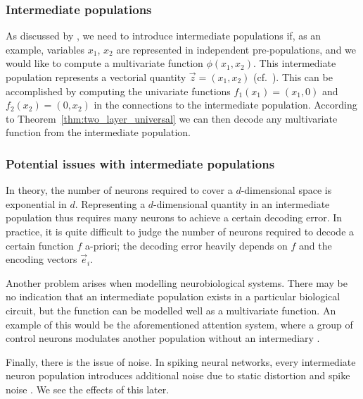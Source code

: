 \subsubsection{Intermediate populations}
As discussed by \citep[Chapter~6]{eliasmith2003neural}, we need to introduce intermediate populations if, as an example, variables $x_1$, $x_2$ are represented in independent pre-populations, and we would like to compute a multivariate function $\phi(x_1, x_2)$.
This intermediate population represents a vectorial quantity $\vec z = (x_1, x_2)$ (cf.~).
This can be accomplished by computing the univariate functions $f_1(x_1) = (x_1, 0)$ and $f_2(x_2) = (0, x_2)$ in the connections to the intermediate population.
According to Theorem~\ref{thm:two_layer_universal} we can then decode any multivariate function from the intermediate population.

\subsubsection{Potential issues with intermediate populations}
In theory, the number of neurons required to cover a $d$-dimensional space is exponential in $d$.
Representing a $d$-dimensional quantity in an intermediate population thus requires many neurons to achieve a certain decoding error.
In practice, it is quite difficult to judge the number of neurons required to decode a certain function $f$ a-priori; the decoding error heavily depends on $f$ and the encoding vectors $\vec e_i$.

Another problem arises when modelling neurobiological systems.
There may be no indication that an intermediate population exists in a particular biological circuit, but the function can be modelled well as a multivariate function.
An example of this would be the aforementioned attention system, where a group of control neurons modulates another population without an intermediary \citep{bobier2014unifying}.

Finally, there is the issue of noise.
In spiking neural networks, every intermediate neuron population introduces additional noise due to static distortion and spike noise \citep[Section~2.2.2]{eliasmith2003neural}.
We see the effects of this later.


